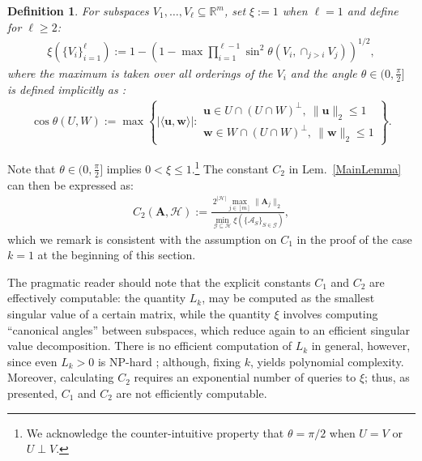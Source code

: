 \documentclass[9pt,twocolumn]{pnas-new}
\newtheorem{definition}{Definition}
\begin{document}
\begin{definition}\label{SpecialSupportSet}\label{FriedrichsDefinition}
For subspaces $V_1, \ldots, V_\ell \subseteq \mathbb{R}^m$, set $\xi := 1$ when $\ell = 1$ and define for $\ell \geq 2$:
\begin{align*}
\xi(\{V_i\}_{i=1}^\ell) := 1 - \left(1 -  \max \prod_{i=1}^{\ell-1} \sin^2  \theta \left(V_i, \cap_{j>i} V_j \right)  \right)^{1/2},
\end{align*} 
%
where the maximum is taken over all orderings 
of the $V_i$ and the angle $\theta \in (0,\frac{\pi}{2}]$ is defined implicitly as \cite[Def.~9.4]{Deutsch12}:
\begin{align*}
\cos{\theta(U,W)} := \max\left\{ |\langle \mathbf{u}, \mathbf{w} \rangle|: \substack{ \mathbf{u} \in U \cap (U \cap W)^\perp, \ \|\mathbf{u}\|_2 \leq 1 \\ \mathbf{w} \in W \cap (U \cap W)^\perp, \  \|\mathbf{w}\|_2 \leq 1 } \right\}.
\end{align*}
\end{definition}
Note that $\theta \in (0,\frac{\pi}{2}]$ implies $0 < \xi \leq 1$.\footnote{We acknowledge the counter-intuitive property that $\theta =  \pi/2$ when $U = V$ or $U \perp V$.}  
The constant $C_2$ in Lem.~\ref{MainLemma} can then be expressed as:  
\begin{align}\label{Cdef2}
C_2(\mathbf{A}, \mathcal{H}) := \frac{ 2^{|\mathcal{H}|} \max_{j \in [m]} \|\mathbf{A}_j\|_2}{ \min_{\mathcal{G} \subseteq \mathcal{H}} \xi( \{ \bm{\mathcal{A}}_S \}_{S \in \mathcal{G}}) },
\end{align}
%
which we remark is consistent with the assumption on $C_1$ in the proof of the case $k=1$ at the beginning of this section.  

The pragmatic reader should note that the explicit constants $C_1$ and $C_2$ are effectively computable: the quantity $L_k$, may be computed as the smallest singular value of a certain matrix, while the quantity $\xi$ involves computing ``canonical angles'' between subspaces, which reduce again to an efficient singular value decomposition. There is no efficient computation of $L_k$ in general, however, since even $L_{k} > 0$ is NP-hard \cite{tillmann2014computational}; although, fixing $k$, yields polynomial complexity. Moreover, calculating $C_2$ requires an exponential number of queries to $\xi$; thus, as presented, $C_1$ and $C_2$ are not efficiently computable.
\end{document}
